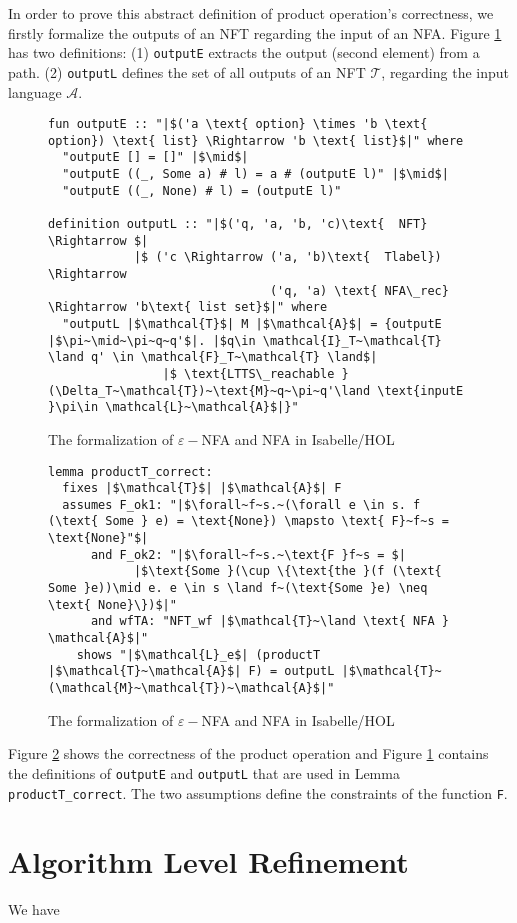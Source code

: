 \documentclass[a4paper,UKenglish,cleveref, autoref, thm-restate]{lipics-v2021}
\begin{document}
In order to prove this abstract definition of product operation's correctness, we firstly formalize the outputs of an NFT regarding the input of an NFA. Figure \ref{fig-def-output} has two definitions: (1) \texttt{outputE} extracts the output (second element) from a path. (2) \texttt{outputL} defines the set of all outputs of an NFT $\mathcal{T}$, regarding the input language $\mathcal{A}$.

\begin{figure}[ht]
	\begin{lstlisting}
fun outputE :: "|$('a \text{ option} \times 'b \text{ option}) \text{ list} \Rightarrow 'b \text{ list}$|" where
  "outputE [] = []" |$\mid$|
  "outputE ((_, Some a) # l) = a # (outputE l)" |$\mid$|
  "outputE ((_, None) # l) = (outputE l)"

definition outputL :: "|$('q, 'a, 'b, 'c)\text{  NFT} \Rightarrow $|
            |$ ('c \Rightarrow ('a, 'b)\text{  Tlabel}) \Rightarrow 
                               ('q, 'a) \text{ NFA\_rec} \Rightarrow 'b\text{ list set}$|" where
  "outputL |$\mathcal{T}$| M |$\mathcal{A}$| = {outputE |$\pi~\mid~\pi~q~q'$|. |$q\in \mathcal{I}_T~\mathcal{T} \land q' \in \mathcal{F}_T~\mathcal{T} \land$|
                |$ \text{LTTS\_reachable }(\Delta_T~\mathcal{T})~\text{M}~q~\pi~q'\land \text{inputE }\pi\in \mathcal{L}~\mathcal{A}$|}" 
	\end{lstlisting}
\caption{The formalization of $\varepsilon-$NFA and NFA in Isabelle/HOL}
\label{fig-def-output}
\end{figure}


\begin{figure}[ht]
	\begin{lstlisting}
lemma productT_correct:
  fixes |$\mathcal{T}$| |$\mathcal{A}$| F
  assumes F_ok1: "|$\forall~f~s.~(\forall e \in s. f (\text{ Some } e) = \text{None}) \mapsto \text{ F}~f~s = \text{None}"$|
      and F_ok2: "|$\forall~f~s.~\text{F }f~s = $|
            |$\text{Some }(\cup \{\text{the }(f (\text{ Some }e))\mid e. e \in s \land f~(\text{Some }e) \neq \text{ None}\})$|"
      and wfTA: "NFT_wf |$\mathcal{T}~\land \text{ NFA } \mathcal{A}$|"
    shows "|$\mathcal{L}_e$| (productT |$\mathcal{T}~\mathcal{A}$| F) = outputL |$\mathcal{T}~(\mathcal{M}~\mathcal{T})~\mathcal{A}$|"

	\end{lstlisting}
\caption{The formalization of $\varepsilon-$NFA and NFA in Isabelle/HOL}
\label{fig-def-product-correct}
\end{figure}

Figure \ref{fig-def-product-correct} shows the correctness of the product operation and Figure \ref{fig-def-output} contains the definitions of \texttt{outputE} and \texttt{outputL} that are used in Lemma \texttt{productT\_correct}.
The two assumptions define the constraints of the function \texttt{F}.

\section{Algorithm Level Refinement}
We have 
\end{document}
